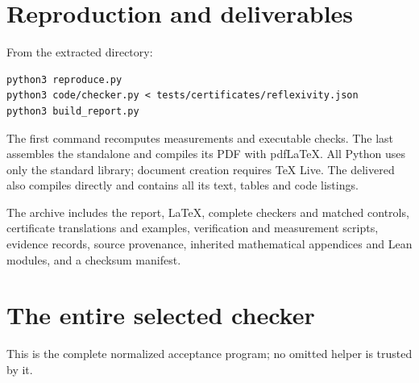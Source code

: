 \section{Reproduction and deliverables}

From the extracted directory:
\begin{lstlisting}
python3 reproduce.py
python3 code/checker.py < tests/certificates/reflexivity.json
python3 build_report.py
\end{lstlisting}
The first command recomputes measurements and executable checks.
The last assembles the standalone  and compiles its PDF
with pdfLaTeX. All Python uses only the standard library; document
creation requires TeX Live. The delivered  also
compiles directly and contains all its text, tables and code listings.

The archive includes the report, LaTeX, complete checkers and matched
controls, certificate translations and examples, verification and
measurement scripts, evidence records, source provenance, inherited
mathematical appendices and Lean modules, and a checksum manifest.

\appendix
\section{The entire selected checker}

This is the complete normalized acceptance program; no omitted helper
is trusted by it.
\begin{lstlisting}[language=Python]
%%CHECKER_SOURCE%%
\end{lstlisting}

